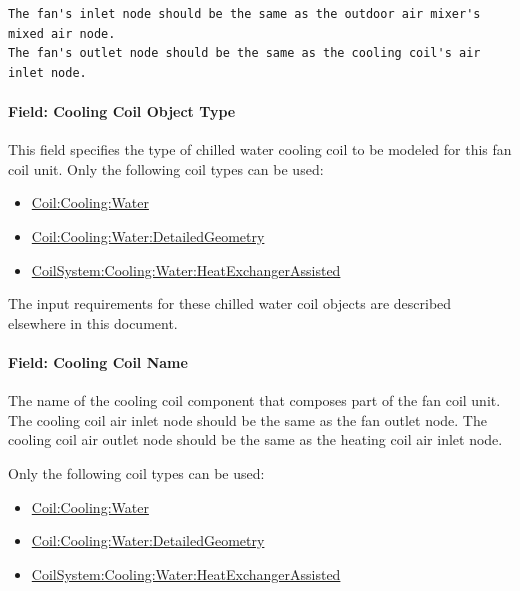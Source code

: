 \begin{lstlisting}
The fan's inlet node should be the same as the outdoor air mixer's mixed air node.
The fan's outlet node should be the same as the cooling coil's air inlet node.
\end{lstlisting}

\paragraph{Field: Cooling Coil Object Type}\label{field-cooling-coil-object-type-003}

This field specifies the type of chilled water cooling coil to be modeled for this fan coil unit. Only the following coil types can be used:

\begin{itemize}
\item
  \hyperref[coilcoolingwater]{Coil:Cooling:Water}
\item
  \hyperref[coilcoolingwaterdetailedgeometry]{Coil:Cooling:Water:DetailedGeometry}
\item
  \hyperref[coilsystemcoolingwaterheatexchangerassisted]{CoilSystem:Cooling:Water:HeatExchangerAssisted}
\end{itemize}

The input requirements for these chilled water coil objects are described elsewhere in this document.

\paragraph{Field: Cooling Coil Name}\label{field-cooling-coil-name-003}

The name of the cooling coil component that composes part of the fan coil unit. The cooling coil air inlet node should be the same as the fan outlet node. The cooling coil air outlet node should be the same as the heating coil air inlet node.

Only the following coil types can be used:

\begin{itemize}
\item
  \hyperref[coilcoolingwater]{Coil:Cooling:Water}
\item
  \hyperref[coilcoolingwaterdetailedgeometry]{Coil:Cooling:Water:DetailedGeometry}
\item
  \hyperref[coilsystemcoolingwaterheatexchangerassisted]{CoilSystem:Cooling:Water:HeatExchangerAssisted}
\end{itemize}

